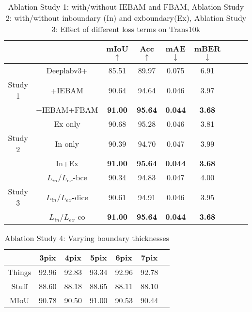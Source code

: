 \documentclass[10pt,twocolumn,letterpaper]{article}
\begin{document}
\begin{table}\scriptsize
  \centering
  \begin{tabular}{ccccccccc}
    \toprule
     &&mIoU $\uparrow$ & Acc $\uparrow$ & mAE $\downarrow$ &mBER $\downarrow$ \\
    \midrule
    &Deeplabv3+ & 85.51 & 89.97 &0.075 &6.91\\
    Study 1&+IEBAM & 90.64 &94.64  &0.046 &3.97\\
    &\scriptsize{+IEBAM+FBAM} & \textbf{91.00} & \textbf{95.64}  &\textbf{0.044} &\textbf{3.68}\\
    \midrule
    &Ex only & 90.68 &95.28  &0.046&3.81\\
   Study 2& In only  & 90.39 &94.70  &0.047&3.99\\
   & In+Ex   & \textbf{91.00} & \textbf{95.64}  &\textbf{0.044} &\textbf{3.68}\\
    \midrule
    &${\textit{L}}_{in}$/${\textit{L}}_{ex}$-bce&90.34&94.83&0.047&4.00 \\
    Study 3&${\textit{L}}_{in}$/${\textit{L}}_{ex}$-dice&90.61&94.91&0.046&3.95\\
    & ${\textit{L}}_{in}$/${\textit{L}}_{ex}$-co& \textbf{91.00} & \textbf{95.64}  &\textbf{0.044} &\textbf{3.68}\\
    \bottomrule
  \end{tabular}
          \vspace*{-2mm}
  \caption{Ablation Study 1: with/without IEBAM and FBAM, Ablation Study 2: with/without inboundary (In) and exboundary(Ex), Ablation Study 3: Effect of different loss terms on Trans10k}
          \vspace*{-1mm}
  \label{trans10kinex}
\end{table}




\begin{table}\scriptsize
  \centering
  \begin{tabular}{ccccccc}
    \toprule
     &3pix&4pix &5pix&6pix &7pix \\
    \midrule
    Things&92.96  & 92.83 &93.34 &92.96 &92.78\\
    Stuff &88.60  &88.18  &88.65 & 88.11 &88.10 \\
    MIoU  &90.78  &90.50  &91.00 &90.53 &90.44\\
    \bottomrule
  \end{tabular}
          \vspace*{-2mm}
  \caption{Ablation Study 4: Varying boundary thicknesses}
          \vspace*{-4mm}
  \label{thickness}
\end{table}
\end{document}
